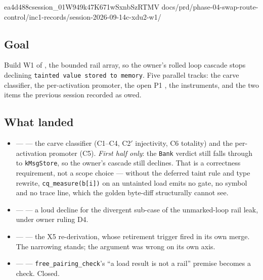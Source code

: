%
  {ea4d488c}{session\_01W949k47K671wSxnbSzRTMV}%
  {docs/prd/phase-04-swap-route-control/inc1-records/session-2026-09-14c-xdu2-w1/}

\subsection*{Goal}
Build W1 of , the bounded rail array, so the owner's rolled loop cascade stops
declining \texttt{tainted value stored to memory}. Five parallel tracks: the carve
classifier, the per-activation promoter, the open P1 , the instruments, and the
two items the previous session recorded as owed.

\subsection*{What landed}
\begin{itemize}
  \item {} ---  --- the carve classifier (C1--C4, C2$'$ injectivity,
        C6 totality) and the per-activation promoter (C5). \emph{First half only}: the
        \texttt{Bank} verdict still falls through to \texttt{kMsgStore}, so the owner's
        cascade still declines. That is a correctness requirement, not a scope choice ---
        without the deferred taint rule and type rewrite, \texttt{cq\_measure(b[i])} on an
        untainted load emits no gate, no symbol and no trace line, which the golden
        byte-diff structurally cannot see.
  \item {} ---  --- a loud decline for the divergent sub-case of the
        unmarked-loop rail leak, under owner ruling D4.
  \item {} ---  --- the X5 re-derivation, whose retirement trigger
        fired in its own merge. The narrowing stands; the argument was wrong on its own axis.
  \item {} ---  --- \texttt{free\_pairing\_check}'s ``a load result is
        not a rail'' premise becomes a check. Closed.
\end{itemize}

